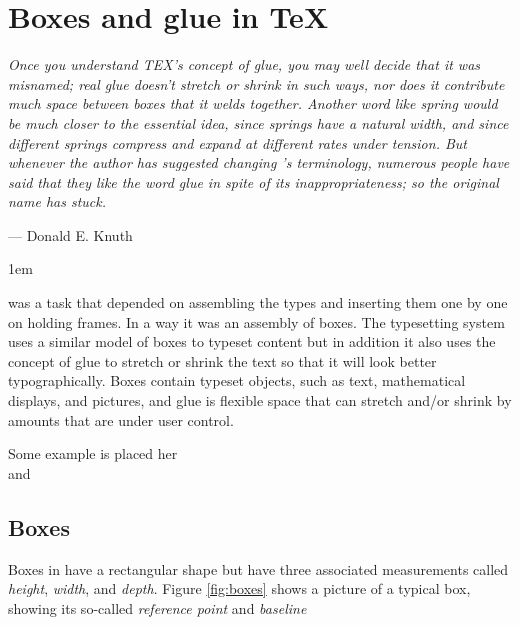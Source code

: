 

\chapter{Boxes and glue in TeX}

\setlength{\columnsep}{2em}
{\it Once you understand TEX's concept of glue, you may well decide that
it was misnamed; real glue doesn't stretch or shrink in such ways, nor does it
contribute much space between boxes that it welds together. Another word like
\emph{spring} would be much closer to the essential idea, since springs have a natural
width, and since different springs compress and expand at different rates
under tension. But whenever the author has suggested changing \tex's terminology,
numerous people have said that they like the word \emph{glue} in spite of its
inappropriateness; so the original name has stuck. }
\smallskip

{\hfill  ---  Donald E. Knuth}

\medskip   %




\parindent1em







 was a task that depended on assembling the types and inserting them one by one on holding frames. In a way it was an assembly of boxes.
The \tex typesetting system uses a similar model of boxes to typeset content but in addition it also uses the concept of glue to stretch or shrink the text so that it will look better typographically. Boxes contain
typeset objects, such as text, mathematical displays, and pictures, and glue
is flexible space that can stretch and/or shrink by amounts that are under
user control.

\topline

Some example is placed her\\
and

\bottomline

\section*{Boxes}

Boxes in \tex have  a rectangular shape but have
three associated measurements called \emph{height}, \emph{width}, and \emph{depth}.
Figure \ref{fig:boxes} shows a 
picture of a typical box, showing its so-called \emph{reference point} and \emph{baseline}

